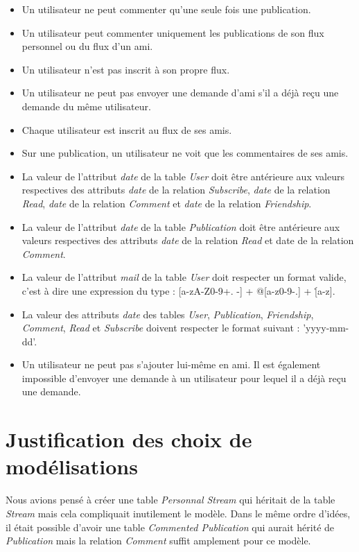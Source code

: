 \documentclass[a4paper,10pt]{article}
\begin{document}
	\begin{itemize}
	    \item Un utilisateur ne peut commenter qu'une seule fois une publication.
	    \item Un utilisateur peut commenter uniquement les publications de son flux personnel ou du flux d'un ami.
	    \item Un utilisateur n'est pas inscrit à son propre flux.
	    \item Un utilisateur ne peut pas envoyer une demande d'ami s'il a déjà reçu une demande du même utilisateur.
	    \item Chaque utilisateur est inscrit au flux de ses amis.
	    \item Sur une publication, un utilisateur ne voit que les commentaires de ses amis.
	    \item La valeur de l'attribut \textsl{date} de la table \textsl{User} doit être antérieure aux valeurs respectives des attributs \textsl{date} de la relation \textsl{Subscribe}, \textsl{date} de la relation \textsl{Read}, \textsl{date} de la relation \textsl{Comment} et \textsl{date} de la relation \textsl{Friendship}.
	    \item La valeur de l'attribut \textsl{date} de la table \textsl{Publication} doit être antérieure aux valeurs respectives des attributs \textsl{date} de la relation \textsl{Read} et date de la relation \textsl{Comment}.
	    \item La valeur de l'attribut \textsl{mail} de la table \textsl{User} doit respecter un format valide, c'est à dire une expression du type : [a-zA-Z0-9+. -] + @[a-z0-9-.] + \.[a-z].
	    \item La valeur des attributs \textsl{date} des tables \textsl{User}, \textsl{Publication}, \textsl{Friendship}, \textsl{Comment}, \textsl{Read} et \textsl{Subscribe} doivent respecter le format suivant : 'yyyy-mm-dd'.
	    \item Un utilisateur ne peut pas s'ajouter lui-même en ami. Il est également impossible d'envoyer une demande à un utilisateur pour lequel il a déjà reçu une demande.
	\end{itemize}

\section{Justification des choix de modélisations}

Nous avions pensé à créer une table \textsl{Personnal Stream} qui héritait de la table \textsl{Stream} mais cela compliquait inutilement le modèle. Dans le même ordre d'idées, il était possible d'avoir une table \textsl{Commented Publication} qui aurait hérité de \textsl{Publication} mais la relation \textsl{Comment} suffit amplement pour ce modèle.
\end{document}
